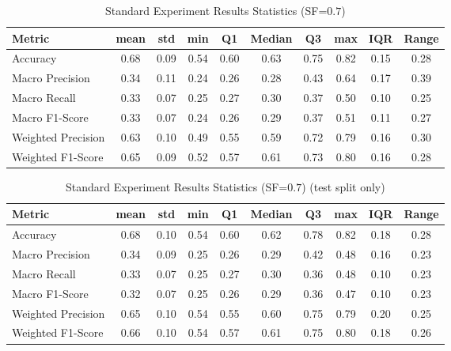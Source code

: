 \begin{table}[h]
\caption{Standard Experiment Results Statistics (SF=$0.7$)}
\label{tab:sf0.7_Standard_Results_Statistics}
\begin{tabular}{|l|c|c|c|c|c|c|c|c|c|}
\toprule
Metric & mean & std & min & Q1 & Median & Q3 & max & IQR & Range \\
\midrule
Accuracy & 0.68 & 0.09 & 0.54 & 0.60 & 0.63 & 0.75 & 0.82 & 0.15 & 0.28 \\
Macro Precision & 0.34 & 0.11 & 0.24 & 0.26 & 0.28 & 0.43 & 0.64 & 0.17 & 0.39 \\
Macro Recall & 0.33 & 0.07 & 0.25 & 0.27 & 0.30 & 0.37 & 0.50 & 0.10 & 0.25 \\
Macro F1-Score & 0.33 & 0.07 & 0.24 & 0.26 & 0.29 & 0.37 & 0.51 & 0.11 & 0.27 \\
Weighted Precision & 0.63 & 0.10 & 0.49 & 0.55 & 0.59 & 0.72 & 0.79 & 0.16 & 0.30 \\
Weighted F1-Score & 0.65 & 0.09 & 0.52 & 0.57 & 0.61 & 0.73 & 0.80 & 0.16 & 0.28 \\
\bottomrule
\end{tabular}
\end{table}

\begin{table}[h]
\caption{Standard Experiment Results Statistics (SF=$0.7$) (test split only)}
\label{tab:sf0.7_test_Standard_Results_Statistics}
\begin{tabular}{|l|c|c|c|c|c|c|c|c|c|}
\toprule
Metric & mean & std & min & Q1 & Median & Q3 & max & IQR & Range \\
\midrule
Accuracy & 0.68 & 0.10 & 0.54 & 0.60 & 0.62 & 0.78 & 0.82 & 0.18 & 0.28 \\
Macro Precision & 0.34 & 0.09 & 0.25 & 0.26 & 0.29 & 0.42 & 0.48 & 0.16 & 0.23 \\
Macro Recall & 0.33 & 0.07 & 0.25 & 0.27 & 0.30 & 0.36 & 0.48 & 0.10 & 0.23 \\
Macro F1-Score & 0.32 & 0.07 & 0.25 & 0.26 & 0.29 & 0.36 & 0.47 & 0.10 & 0.23 \\
Weighted Precision & 0.65 & 0.10 & 0.54 & 0.55 & 0.60 & 0.75 & 0.79 & 0.20 & 0.25 \\
Weighted F1-Score & 0.66 & 0.10 & 0.54 & 0.57 & 0.61 & 0.75 & 0.80 & 0.18 & 0.26 \\
\bottomrule
\end{tabular}
\end{table}

